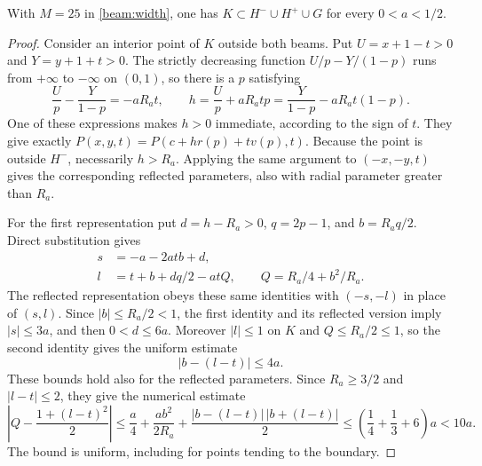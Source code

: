 \begin{lemma}\label{beam:coverage}
With $M=25$ in \eqref{beam:width}, one has
$K\subset H^-\cup H^+\cup G$ for every $0<a<1/2$.
\end{lemma}
\begin{proof}
Consider an interior point of $K$ outside both beams. Put
$U=x+1-t>0$ and $Y=y+1+t>0$. The strictly decreasing function
$U/p-Y/(1-p)$ runs from $+\infty$ to $-\infty$ on $(0,1)$, so there
is a $p$ satisfying
\[
 \frac Up-\frac Y{1-p}=-aR_a t,\qquad
 h=\frac Up+aR_a tp=\frac Y{1-p}-aR_a t(1-p).
\]
One of these expressions makes $h>0$ immediate, according to the sign of
$t$. They give exactly $P(x,y,t)=P(c+h r(p)+t v(p),t)$.
Because the point is outside $H^-$, necessarily $h>R_a$. Applying the same
argument to $(-x,-y,t)$ gives the corresponding reflected parameters,
also with radial parameter greater than $R_a$.

For the first representation put $d=h-R_a>0$, $q=2p-1$, and $b=R_a q/2$.
Direct substitution gives
\begin{equation}\label{beam:exact-gap}
 \begin{aligned}
 s&=-a-2atb+d,\\
 l&=t+b+dq/2-atQ,\qquad Q=R_a/4+b^2/R_a.
 \end{aligned}
\end{equation}
The reflected representation obeys these same identities with
$(-s,-l)$ in place of $(s,l)$. Since $|b|\le R_a/2<1$, the first identity
and its reflected version imply $|s|\le3a$, and then $0<d\le6a$.
Moreover $|l|\le1$ on $K$ and $Q\le R_a/2\le1$, so the second identity
gives the uniform estimate
\begin{equation}\label{beam:b-error}
 |b-(l-t)|\le4a.
\end{equation}
These bounds hold also for the reflected parameters. Since $R_a\ge3/2$
and $|l-t|\le2$, they give the numerical estimate
\begin{equation}\label{beam:uniform-constant}
 \left|Q-\frac{1+(l-t)^2}{2}\right|
 \le \frac a4+\frac{a b^2}{2R_a}
       +\frac{|b-(l-t)|\,|b+(l-t)|}{2}
 \le\left(\frac14+\frac13+6\right)a<10a.
\end{equation}
The bound is uniform, including for points tending to the boundary.


\end{proof}
